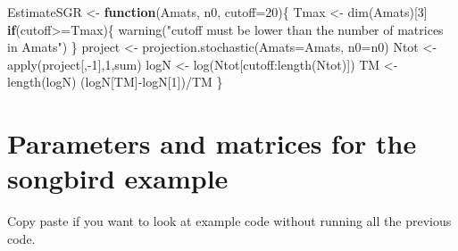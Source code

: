\documentclass[
]{book}
\newenvironment{Shaded}{\begin{snugshade}}{\end{snugshade}}
\newcommand{\AttributeTok}[1]{\textcolor[rgb]{0.77,0.63,0.00}{#1}}
\newcommand{\ControlFlowTok}[1]{\textcolor[rgb]{0.13,0.29,0.53}{\textbf{#1}}}
\newcommand{\DecValTok}[1]{\textcolor[rgb]{0.00,0.00,0.81}{#1}}
\newcommand{\FunctionTok}[1]{\textcolor[rgb]{0.00,0.00,0.00}{#1}}
\newcommand{\NormalTok}[1]{#1}
\newcommand{\OtherTok}[1]{\textcolor[rgb]{0.56,0.35,0.01}{#1}}
\newcommand{\SpecialCharTok}[1]{\textcolor[rgb]{0.00,0.00,0.00}{#1}}
\newcommand{\StringTok}[1]{\textcolor[rgb]{0.31,0.60,0.02}{#1}}
\begin{document}
\begin{Shaded}
\begin{Highlighting}[]
\NormalTok{EstimateSGR }\OtherTok{\textless{}{-}} \ControlFlowTok{function}\NormalTok{(Amats, n0, }\AttributeTok{cutoff=}\DecValTok{20}\NormalTok{)\{}
\NormalTok{  Tmax }\OtherTok{\textless{}{-}} \FunctionTok{dim}\NormalTok{(Amats)[}\DecValTok{3}\NormalTok{]}
    \ControlFlowTok{if}\NormalTok{(cutoff}\SpecialCharTok{\textgreater{}=}\NormalTok{Tmax)\{}
      \FunctionTok{warning}\NormalTok{(}\StringTok{"cutoff must be lower }
\StringTok{              than the number of }
\StringTok{              matrices in Amats"}\NormalTok{)}
\NormalTok{      \}}
\NormalTok{  project }\OtherTok{\textless{}{-}} \FunctionTok{projection.stochastic}\NormalTok{(}\AttributeTok{Amats=}\NormalTok{Amats, }\AttributeTok{n0=}\NormalTok{n0) }
\NormalTok{  Ntot }\OtherTok{\textless{}{-}} \FunctionTok{apply}\NormalTok{(project[,}\SpecialCharTok{{-}}\DecValTok{1}\NormalTok{],}\DecValTok{1}\NormalTok{,sum)}
\NormalTok{  logN }\OtherTok{\textless{}{-}} \FunctionTok{log}\NormalTok{(Ntot[cutoff}\SpecialCharTok{:}\FunctionTok{length}\NormalTok{(Ntot)])}
\NormalTok{  TM }\OtherTok{\textless{}{-}} \FunctionTok{length}\NormalTok{(logN)}
\NormalTok{  (logN[TM]}\SpecialCharTok{{-}}\NormalTok{logN[}\DecValTok{1}\NormalTok{])}\SpecialCharTok{/}\NormalTok{TM}
\NormalTok{\}}
\end{Highlighting}
\end{Shaded}

\hypertarget{parameters-and-matrices-for-the-songbird-example}{%
\section{Parameters and matrices for the songbird example}\label{parameters-and-matrices-for-the-songbird-example}}

Copy paste if you want to look at example code without running all the previous code.
\end{document}
